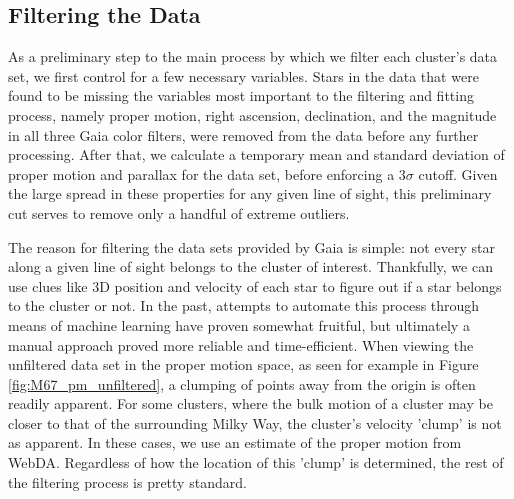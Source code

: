 \documentclass[onecolumn,table,xcdraw,super]{aastex631}
\begin{document}
\subsection{Filtering the Data} \label{sec:filtering}
As a preliminary step to the main process by which we filter each cluster's data set, we first control for a few necessary variables. Stars in the data that were found to be missing the variables most important to the filtering and fitting process, namely proper motion, right ascension, declination, and the magnitude in all three Gaia color filters, were removed from the data before any further processing. After that, we calculate a temporary mean and standard deviation of proper motion and parallax for the data set, before enforcing a $3\sigma$ cutoff. Given the large spread in these properties for any given line of sight, this preliminary cut serves to remove only a handful of extreme outliers.

The reason for filtering the data sets provided by Gaia is simple: not every star along a given line of sight belongs to the cluster of interest. Thankfully, we can use clues like 3D position and velocity of each star to figure out if a star belongs to the cluster or not. In the past, attempts to automate this process through means of machine learning have proven somewhat fruitful, but ultimately a manual approach proved more reliable and time-efficient. When viewing the unfiltered data set in the proper motion space, as seen for example in Figure \ref{fig:M67_pm_unfiltered}, a clumping of points away from the origin is often readily apparent. For some clusters, where the bulk motion of a cluster may be closer to that of the surrounding Milky Way, the cluster's velocity 'clump' is not as apparent. In these cases, we use an estimate of the proper motion from WebDA. Regardless of how the location of this 'clump' is determined, the rest of the filtering process is pretty standard.
\end{document}
